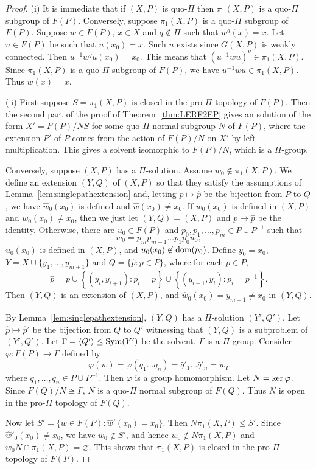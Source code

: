 \documentclass[10pt,a4paper]{amsart}
\theoremstyle{definition}
\theoremstyle{definition}
\numberwithin{equation}{section}
\begin{document}
\begin{proof} (i) It is immediate that if $(X, P)$ is quo-$\Pi$ then $\pi_1(X, P)$ is a quo-$\Pi$ subgroup of $F(P)$. Conversely, suppose $\pi_1(X, P)$ is a quo-$\Pi$ subgroup of $F(P)$. Suppose $w\in F(P)$, $x\in X$ and $q\not\in \Pi$ such that $w^q(x)=x$. Let $u\in F(P)$ be such that $u(x_0)=x$. Such $u$ exists since $G(X, P)$ is weakly connected. Then $u^{-1}w^qu(x_0)=x_0$. This means that $(u^{-1}wu)^q\in \pi_1(X, P)$. Since $\pi_1(X, P)$ is a quo-$\Pi$ subgroup of $F(P)$, we have $u^{-1}wu\in \pi_1(X, P)$. Thus $w(x)=x$. 

(ii) First suppose $S=\pi_1(X, P)$ is closed in the pro-$\Pi$ topology of $F(P)$. Then the second part of the proof of Theorem~\ref{thm:LERF2EP} gives an solution of the form $X'=F(P)/NS$ for some quo-$\Pi$ normal subgroup $N$ of $F(P)$, where the extension $P'$ of $P$ comes from the action of $F(P)/N$ on $X'$ by left multiplication. This gives a solvent isomorphic to $F(P)/N$, which is a $\Pi$-group.

Conversely, suppose $(X, P)$ has a $\Pi$-solution. Assume $w_0\not\in \pi_1(X, P)$.  We define an extension $(Y, Q)$ of $(X, P)$ so that they satisfy the assumptions of Lemma~\ref{lem:singlepathextension} and, letting $p\mapsto \hat{p}$ be the bijection from $P$ to $Q$, we have $\hat{w}_0(x_0)$ is defined and $\hat{w}(x_0)\neq x_0$. If $w_0(x_0)$ is defined in $(X, P)$ and $w_0(x_0)\neq x_0$, then we just let $(Y,Q)=(X, P)$ and $p\mapsto \hat{p}$ be the identity. Otherwise, there are $u_0\in F(P)$ and $p_0,p_1,\dots, p_m\in P\cup P^{-1}$ such that 
$$w_0=p_mp_{m-1}\dots p_1p_0u_0, $$
$u_0(x_0)$ is defined in $(X, P)$, and $u_0(x_0)\not\in\mbox{\rm dom}(p_0)$. Define $y_0=x_0$, $Y=X\cup \{y_1,\dots, y_{m+1}\}$ and $Q=\{\hat{p}\colon p\in P\}$, where for each $p\in P$,  
$$ \hat{p}=p\cup\left\{(y_i, y_{i+1})\colon p_i=p\right\}\cup \left\{(y_{i+1}, y_i)\colon p_i=p^{-1}\right\}. $$
Then $(Y, Q)$ is an extension of $(X, P)$, and $\hat{w}_0(x_0)=y_{m+1}\neq x_0$ in $(Y, Q)$. 

By Lemma~\ref{lem:singlepathextension}, $(Y, Q)$ has a $\Pi$-solution $(Y', Q')$. Let $\hat{p}\mapsto \hat{p}'$ be the bijection from $Q$ to $Q'$ witnessing that $(Y, Q)$ is a subproblem of $(Y', Q')$.  Let $\Gamma=\langle Q'\rangle\leq \mbox{\rm Sym}(Y')$ be the solvent. $\Gamma$ is a $\Pi$-group. Consider $\varphi\colon F(P)\to \Gamma$ defined by
$$ \varphi(w)=\varphi(q_1\dots q_n)=\hat{q}'_1\dots \hat{q}'_n=w_\Gamma $$
where $q_1, \dots, q_n\in P\cup P^{-1}$. Then $\varphi$ is a group homomorphism. Let $N=\mbox{\rm ker}\,\varphi$. Since $F(Q)/N\cong \Gamma$, $N$ is a quo-$\Pi$ normal subgroup of $F(Q)$. Thus $N$ is open in the pro-$\Pi$ topology of $F(Q)$.

Now let $S'=\{w\in F(P)\colon \hat{w}'(x_0)=x_0\}$. Then $N\pi_1(X,P)\leq S'$. Since $\hat{w}'_0(x_0)\neq x_0$, we have $w_0\not\in S'$, and hence $w_0\not\in N\pi_1(X, P)$ and $w_0N\cap \pi_1(X, P)=\varnothing$. This shows that $\pi_1(X, P)$ is closed in the pro-$\Pi$ topology of $F(P)$.
\end{proof}
\end{document}
